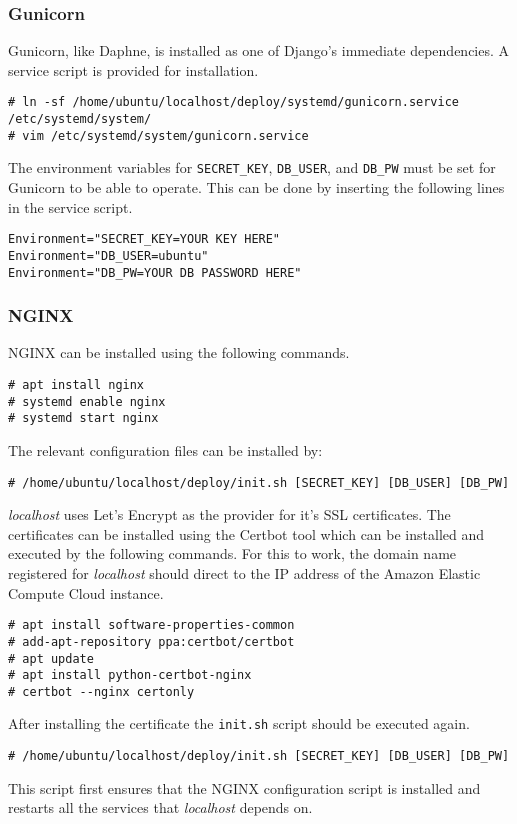 \subsubsection{Gunicorn}

Gunicorn, like Daphne, is installed as one of Django's immediate dependencies.
A service script is provided for installation.
\begin{lstlisting}
# ln -sf /home/ubuntu/localhost/deploy/systemd/gunicorn.service /etc/systemd/system/
# vim /etc/systemd/system/gunicorn.service
\end{lstlisting}
The environment variables for \lstinline{SECRET_KEY}, \lstinline{DB_USER},
and \lstinline{DB_PW} must be set for Gunicorn to be able to operate.
This can be done by inserting the following lines in the service script.
\begin{lstlisting}
Environment="SECRET_KEY=YOUR KEY HERE"
Environment="DB_USER=ubuntu"
Environment="DB_PW=YOUR DB PASSWORD HERE"
\end{lstlisting}

\subsubsection{NGINX}

NGINX can be installed using the following commands.
\begin{lstlisting}
# apt install nginx
# systemd enable nginx
# systemd start nginx
\end{lstlisting}

The relevant configuration files can be installed by:
\begin{lstlisting}
# /home/ubuntu/localhost/deploy/init.sh [SECRET_KEY] [DB_USER] [DB_PW]
\end{lstlisting}

\emph{localhost} uses Let's Encrypt as the provider for it's SSL certificates.
The certificates can be installed using the Certbot tool which can be
installed and executed by the following commands. For this to work, the domain
name registered for \emph{localhost} should direct to the IP address of the
Amazon Elastic Compute Cloud instance.
\begin{lstlisting}
# apt install software-properties-common
# add-apt-repository ppa:certbot/certbot
# apt update
# apt install python-certbot-nginx
# certbot --nginx certonly
\end{lstlisting}

After installing the certificate the \lstinline{init.sh} script should be
executed again.
\begin{lstlisting}
# /home/ubuntu/localhost/deploy/init.sh [SECRET_KEY] [DB_USER] [DB_PW]
\end{lstlisting}
This script first ensures that the NGINX configuration script is installed
and restarts all the services that \emph{localhost} depends on.

